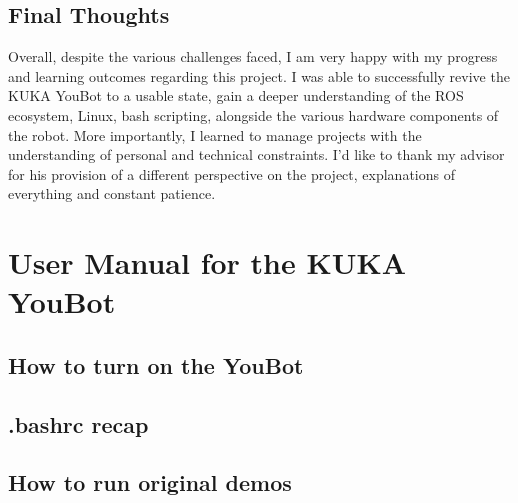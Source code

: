 \documentclass[a4paper, 12pt]{article}
\begin{document}
    \subsection{Final Thoughts}

    Overall, despite the various challenges faced, I am very happy with my progress and learning outcomes regarding this project. I was able to successfully revive the KUKA YouBot to a usable state, gain a deeper understanding of the ROS ecosystem, Linux, bash scripting, alongside the various hardware components of the robot. More importantly, I learned to manage projects with the understanding of personal and technical constraints. I'd like to thank my advisor for his provision of a different perspective on the project, explanations of everything and constant patience.  


    \newpage

    \nocite{*}
    \printbibliography

    \newpage

    \appendix


    \section{User Manual for the KUKA YouBot}

    \subsection{
     How to turn on the YouBot
    }

    \subsection{.bashrc recap}

    \subsection{How to run original demos}

    
    
\end{document}
